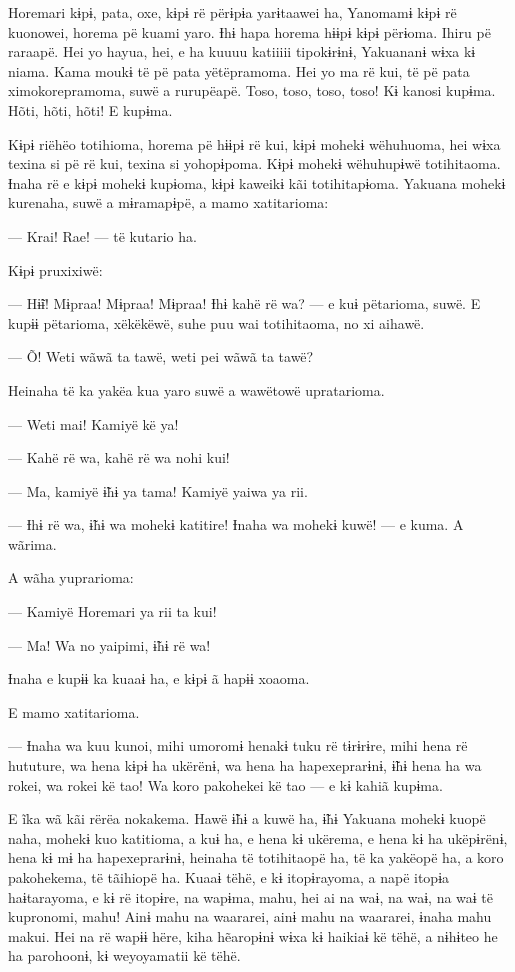 Horemari kɨpɨ, pata, oxe, kɨpɨ rë përɨpɨa yarɨtaawei ha, Yanomamɨ kɨpɨ
rë kuonowei, horema pë kuami yaro. Ɨhɨ hapa horema hɨɨpɨ kɨpɨ përɨoma.
Ihiru pë raraapë. Hei yo hayua, hei, e ha kuuuu katiiiii tipokɨrɨnɨ,
Yakuananɨ wɨxa kɨ niama. Kama moukɨ të pë pata yëtëpramoma. Hei yo ma rë
kui, të pë pata ximokorepramoma, suwë a rurupëapë. Toso, toso, toso,
toso! Kɨ kanosi kupɨma. Hõti, hõti, hõti! E kupɨma. 

Kɨpɨ riëhëo totihioma, horema pë hɨɨpɨ rë kui, kɨpɨ mohekɨ wëhuhuoma,
hei wɨxa texina si pë rë kui, texina si yohopɨpoma. Kɨpɨ mohekɨ
wëhuhupɨwë totihitaoma. Ɨnaha rë e kɨpɨ mohekɨ kupɨoma, kɨpɨ kaweikɨ kãi
totihitapɨoma. Yakuana mohekɨ kurenaha, suwë a mɨramapɨpë, a mamo
xatitarioma: 

--- Krai! Rae! --- të kutario ha. 

Kɨpɨ pruxixiwë: 

--- Hɨ̃ɨ! Mɨpraa! Mɨpraa! Mɨpraa! Ɨhɨ kahë rë wa? --- e kuɨ pëtarioma,
suwë. E kupɨɨ pëtarioma, xëkëkëwë, suhe puu wai totihitaoma, no xi
aihawë. 

--- Õ! Weti wãwã ta tawë, weti pei wãwã ta tawë?

Heinaha të ka yakëa kua yaro suwë a wawëtowë upratarioma. 

--- Weti mai! Kamiyë kë ya!

--- Kahë rë wa, kahë rë wa nohi kui!

--- Ma, kamiyë ɨ̃hɨ ya tama! Kamiyë yaiwa ya rii.

--- Ɨhɨ rë wa, ɨ̃hɨ wa mohekɨ katitire! Ɨnaha wa mohekɨ kuwë! --- e kuma.
A wãrima. 

A wãha yuprarioma: 

--- Kamiyë Horemari ya rii ta kui!

--- Ma! Wa no yaipimi, ɨ̃hɨ rë wa! 

Ɨnaha e kupɨɨ ka kuaaɨ ha, e kɨpɨ ã hapɨɨ xoaoma. 

E mamo xatitarioma. 

--- Ɨnaha wa kuu kunoi, mihi umoromɨ henakɨ tuku rë tɨrɨrɨre, mihi hena
rë hututure, wa hena kɨpɨ ha ukërënɨ, wa hena ha hapexeprarɨnɨ, ɨ̃hɨ hena
ha wa rokei, wa rokei kë tao! Wa koro pakohekei kë tao --- e kɨ kahiã
kupɨma.

E ĩka wã kãi rërëa nokakema. Hawë ɨ̃hɨ a kuwë ha, ɨ̃hɨ Yakuana mohekɨ
kuopë naha, mohekɨ kuo katitioma, a kuɨ ha, e hena kɨ ukërema, e hena kɨ
ha ukëpɨrënɨ, hena kɨ mɨ ha hapexeprarɨnɨ, heinaha të totihitaopë ha, të
ka yakëopë ha, a koro pakohekema, të tãihiopë ha. Kuaaɨ tëhë, e kɨ
itopɨrayoma, a napë itopɨa haɨtarayoma, e kɨ rë itopɨre, na wapɨma,
mahu, hei ai na waɨ, na waɨ, na waɨ të kupronomi, mahu! Ainɨ mahu na
waararei, ainɨ mahu na waararei, ɨnaha mahu makui. Hei na rë wapɨɨ hëre,
kiha hẽaropɨnɨ wɨxa kɨ haikiaɨ kë tëhë, a nɨhɨteo he ha parohoonɨ, kɨ
weyoyamatii kë tëhë. 

